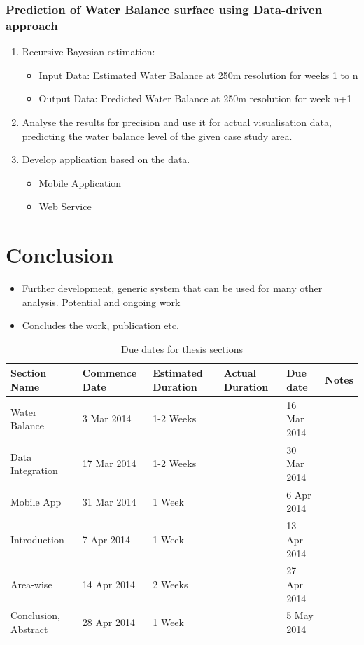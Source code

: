 \documentclass[12pt,journal,compsoc,onecolumn]{IEEEtran}
\begin{document}
\subsubsection{Prediction of Water Balance surface using Data-driven approach}
\begin{enumerate}
\item
Recursive Bayesian estimation:
\begin{itemize}
\item
Input Data: Estimated Water Balance at 250m resolution for weeks 1 to n
\item
Output Data: Predicted Water Balance at 250m resolution for week n+1
\end{itemize}
\item
Analyse the results for precision and use it for actual visualisation data, predicting the water balance level of the given case study area.
\item
Develop application based on the data.
\begin{itemize}
\item
Mobile Application
\item
Web Service
\end{itemize}

\end{enumerate}

\section{Conclusion}
\begin{itemize}
\item
Further development, generic system that can be used for many other analysis. Potential and ongoing work
\item
Concludes the work, publication etc.
\end{itemize}

\appendix

\begin{table}[H]
\begin{center}
    \begin{tabular}{ | l | l | l | l | l | p{4cm} |}
    \hline
    Section Name & Commence Date & Estimated Duration & Actual Duration & Due date & Notes \\ \hline
    Water Balance & 3 Mar 2014 & 1-2 Weeks & & 16 Mar 2014 &  \\ \hline
   Data Integration & 17 Mar 2014 & 1-2 Weeks & & 30 Mar 2014 & \\ \hline
   Mobile App & 31 Mar 2014 & 1 Week & & 6 Apr 2014 & \\ \hline
   Introduction & 7 Apr 2014 & 1 Week & & 13 Apr 2014 & \\ \hline
   Area-wise & 14 Apr 2014 & 2 Weeks & & 27 Apr 2014 & \\ \hline
   Conclusion, Abstract & 28 Apr 2014 & 1 Week & & 5 May 2014 & \\ \hline
    \end{tabular}
\end{center}\caption{Due dates for thesis sections}
\label{table:duedates}
\end{table}
\end{document}

